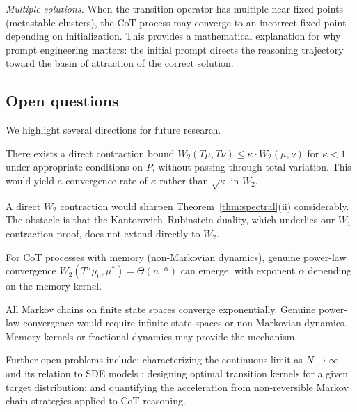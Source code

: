 \emph{Multiple solutions.} When the transition operator has multiple
near-fixed-points (metastable clusters), the CoT process may converge to an
incorrect fixed point depending on initialization. This provides a mathematical
explanation for why prompt engineering matters: the initial prompt directs the
reasoning trajectory toward the basin of attraction of the correct solution.

\subsection{Open questions}\label{sec:open}

We highlight several directions for future research.

\begin{conjecture}\label{conj:W2}
There exists a direct contraction bound
$W_2(T\mu, T\nu) \le \kappa \cdot W_2(\mu, \nu)$ for $\kappa < 1$ under
appropriate conditions on $P$, without passing through total variation. This
would yield a convergence rate of $\kappa$ rather than $\sqrt{\kappa}$ in
$W_2$.
\end{conjecture}

A direct $W_2$ contraction would sharpen Theorem~\ref{thm:spectral}(ii)
considerably. The obstacle is that the Kantorovich--Rubinstein duality, which
underlies our $W_1$ contraction proof, does not extend directly to $W_2$.

\begin{conjecture}\label{conj:nonmarkov}
For CoT processes with memory (non-Markovian dynamics), genuine power-law
convergence $W_2(T^n \mu_0, \mu^*) = \Theta(n^{-\alpha})$ can emerge,
with exponent $\alpha$ depending on the memory kernel.
\end{conjecture}

All Markov chains on finite state spaces converge exponentially. Genuine
power-law convergence would require infinite state spaces or non-Markovian
dynamics. Memory kernels or fractional dynamics \cite{carson2025stochastic}
may provide the mechanism.

Further open problems include: characterizing the continuous limit as
$N \to \infty$ and its relation to SDE models
\cite{carson2025statistical}; designing optimal transition kernels for a
given target distribution; and quantifying the acceleration from
non-reversible Markov chain strategies applied to CoT reasoning.
